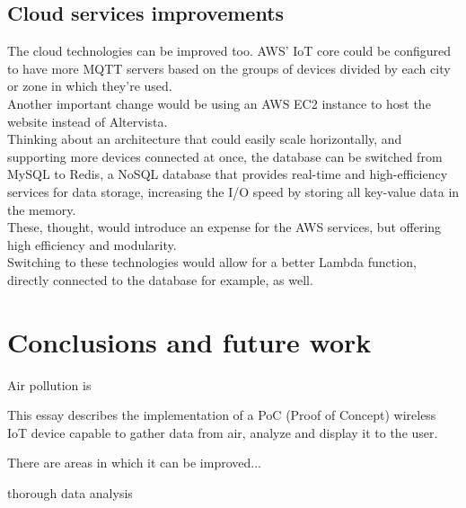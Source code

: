 \documentclass[conference]{IEEEtran}
\begin{document}
	\subsection{Cloud services improvements}
		The cloud technologies can be improved too.
		AWS' IoT core could be configured to have more MQTT servers based on the groups of devices divided by each city or zone in which they're used.\\
		Another important change would be using an AWS EC2 instance to host the website instead of Altervista.\\
		Thinking about an architecture that could easily scale horizontally, and supporting more devices connected at once, the database can be switched from MySQL to Redis,  a NoSQL database that provides real-time and high-efficiency services for data storage, increasing the I/O speed by storing all key-value data in the memory\cite{redis}.\\
		These, thought, would introduce an expense for the AWS services, but offering high efficiency and modularity.\\
		Switching to these technologies would allow for a better Lambda function, directly connected to the database for example, as well.
		
\section{Conclusions and future work}\label{conclusions}

	Air pollution is 

	This essay describes the implementation of a PoC (Proof of Concept) wireless IoT device capable to gather data from air, analyze and display it to the user.
	
	There are areas in which it can be improved...

	thorough data analysis 



\end{document}
